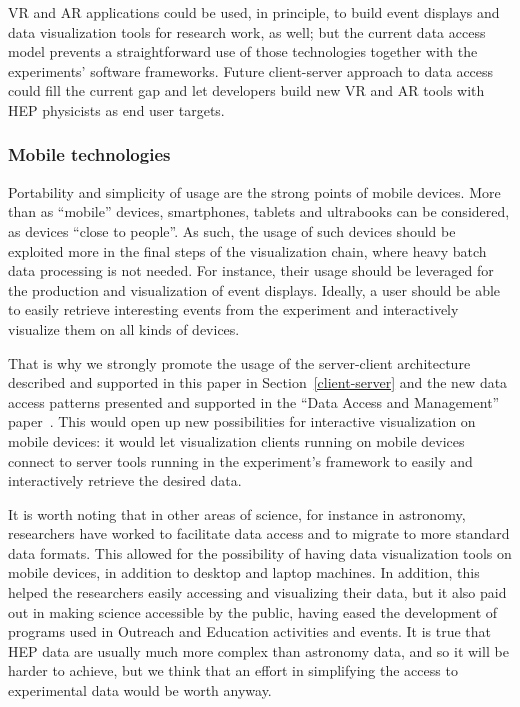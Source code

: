 \documentclass[12pt,a4paper]{article}
\begin{document}
VR and AR applications could be used, in principle, to build event displays and data visualization tools for research work, as well; but the current data access model prevents a straightforward use of those technologies together with the experiments' software frameworks. Future client-server approach to data access could fill the current gap and let developers build new VR and AR tools with HEP physicists as end user targets.



\hypertarget{mobile-tech}{%
\subsubsection{Mobile technologies}\label{mobile-tech}}

Portability and simplicity of usage are the strong points of mobile devices. More than as ``mobile'' devices, smartphones,
tablets and ultrabooks can be considered, as devices ``close to people''. As such, the usage of such devices
should be exploited more in the final steps of the visualization chain, where heavy batch data processing is not needed. For instance,
their usage should be leveraged for the production and visualization of event displays.
Ideally, a user should be able to easily retrieve interesting events from the experiment and interactively visualize them on all
kinds of devices.

That is why we strongly promote the usage of the server-client architecture described and supported in this paper in Section~\ref{client-server}
and the new data access patterns presented and supported in the ``Data Access and Management'' paper~\cite{HSF-CWP-2017-04}. This would open
up new possibilities for interactive visualization on mobile devices: it would let visualization clients running on mobile devices
connect to server tools running in the experiment's framework to easily and interactively retrieve the desired data.

It is worth noting that in other areas of science, for instance in astronomy, researchers have worked to facilitate data
access and to migrate to more standard data formats. This allowed for the possibility of having data visualization tools
on mobile devices, in addition to desktop and laptop machines. In addition, this helped the researchers easily accessing and visualizing
their data, but it also paid out in making science accessible by the public, having eased the development of programs used in
Outreach and Education activities and events. It is true that HEP data are usually much more complex than astronomy data, and so it
will be harder to achieve, but we think that an effort in simplifying the access to experimental data would be worth anyway.
\end{document}
